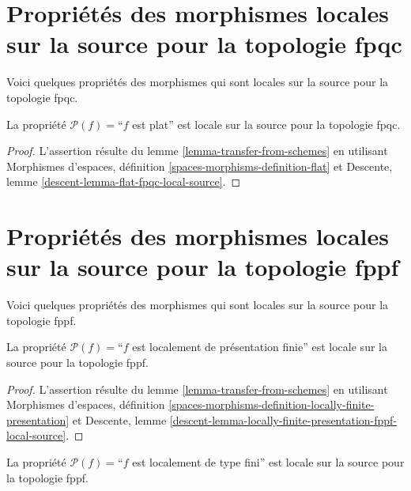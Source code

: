 \section{Propriétés des morphismes locales sur la source pour la topologie fpqc}
\label{section-fpqc-local-source}

\noindent
Voici quelques propriétés des morphismes qui sont locales sur la source pour la topologie fpqc.

\begin{lemma}
\label{lemma-flat-fpqc-local-source}
La propriété $\mathcal{P}(f)=$``$f$ est plat'' est locale sur la source pour la topologie fpqc.
\end{lemma}

\begin{proof}
L'assertion résulte du
lemme \ref{lemma-transfer-from-schemes}
en utilisant
Morphismes d'espaces, définition \ref{spaces-morphisms-definition-flat}
et
Descente, lemme \ref{descent-lemma-flat-fpqc-local-source}.
\end{proof}










\section{Propriétés des morphismes locales sur la source pour la topologie fppf}
\label{section-fppf-local-source}

\noindent
Voici quelques propriétés des morphismes qui sont locales sur la source pour la topologie fppf.

\begin{lemma}
\label{lemma-locally-finite-presentation-fppf-local-source}
La propriété $\mathcal{P}(f)=$``$f$ est localement de présentation finie''
est locale sur la source pour la topologie fppf.
\end{lemma}

\begin{proof}
L'assertion résulte du
lemme \ref{lemma-transfer-from-schemes}
en utilisant
Morphismes d'espaces,
définition \ref{spaces-morphisms-definition-locally-finite-presentation}
et
Descente,
lemme \ref{descent-lemma-locally-finite-presentation-fppf-local-source}.
\end{proof}

\begin{lemma}
\label{lemma-locally-finite-type-fppf-local-source}
La propriété $\mathcal{P}(f)=$``$f$ est localement de type fini''
est locale sur la source pour la topologie fppf.
\end{lemma}

